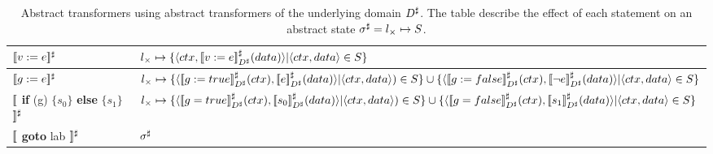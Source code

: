 \begin{table*}
\footnotesize
\begin{tabular}{ll}
\hline
$\lbrack\!\lbrack v:=e \rbrack\!\rbrack^{\sharp}$ & $l_{\times} \mapsto \{\langle ctx,\lbrack\!\lbrack v:=e \rbrack\!\rbrack^{\sharp}_{D^\sharp}(data) \rangle | \langle ctx,data \rangle \in S \}$ 
\\ \hline
$\lbrack\!\lbrack g:=e \rbrack\!\rbrack^{\sharp}$ & $l_{\times} \mapsto \{\langle \asemp{g:=true}_{\A{D}}(ctx),\asemp{e}_{\A{D}}(data) \rangle  | \langle ctx,data \rangle) \in S \} \cup \{ \langle \asemp{g:=false}_{\A{D}}(ctx),\asemp{\neg e}_{\A{D}}(data) \rangle | \langle ctx, data \rangle \in S \}$ 
\\ \hline
$\lbrack\!\lbrack$ \textbf{if} (g) $\{s_{0}\}$ \textbf{else} $\{s_{1}\}$ $\rbrack\!\rbrack^{\sharp}$ &
$l_{\times} \mapsto \{\langle\asemp{g=true}_{\A{D}}(ctx),  \asemp{s_0}_{\A{D}}(data) \rangle | \langle ctx,data \rangle) \in S \} \cup \{\langle \asemp{g=false}_{\A{D}}(ctx), \asemp{s_1}_{\A{D}}(data) \rangle | \langle ctx,data \rangle \in S \}$ 
\\ \hline
$\lbrack\!\lbrack$ \textbf{goto} lab $\rbrack\!\rbrack^{\sharp}$& $\sigma^\sharp$ 
\\ \hline
\end{tabular}
\caption{Abstract transformers using abstract transformers of the underlying domain $D^\sharp$. The table describe the effect of each statement on an abstract state $\sigma^\sharp = l_{\times} \mapsto S$.}\label{Ta:AbsTrans}
\end{table*} 